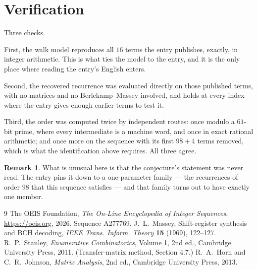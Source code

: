 \documentclass[11pt,a4paper]{article}
\theoremstyle{plain}
\theoremstyle{definition}
\newtheorem{remark}[theorem]{Remark}
\begin{document}
\section{Verification}

Three checks.

First, the walk model reproduces all $16$ terms the entry publishes, exactly, in integer
arithmetic. This is what ties the model to the entry, and it is the only place where reading
the entry's English enters.

Second, the recovered recurrence was evaluated directly on those published terms, with no
matrices and no Berlekamp--Massey involved, and holds at every index where the entry gives
enough earlier terms to test it.

Third, the order was computed twice by independent routes: once modulo a $61$-bit prime, where
every intermediate is a machine word, and once in exact rational arithmetic; and once more on
the sequence with its first $98+4$ terms removed, which is what the identification above
requires. All three agree.

\begin{remark}
What is unusual here is that the conjecture's statement was never read. The entry pins it down
to a one-parameter family --- the recurrences of order $98$ that this sequence satisfies
--- and that family turns out to have exactly one member.
\end{remark}

\begin{thebibliography}{9}
 The OEIS Foundation, \emph{The On-Line Encyclopedia of Integer
Sequences}, \url{https://oeis.org}, 2026. Sequence A277769.
 J.~L.~Massey, Shift-register synthesis and BCH decoding, \emph{IEEE
Trans. Inform. Theory} \textbf{15} (1969), 122--127.
 R.~P.~Stanley, \emph{Enumerative Combinatorics}, Volume 1, 2nd ed.,
Cambridge University Press, 2011. (Transfer-matrix method, Section 4.7.)
 R.~A.~Horn and C.~R.~Johnson, \emph{Matrix Analysis}, 2nd ed., Cambridge
University Press, 2013.
\end{thebibliography}
\end{document}
